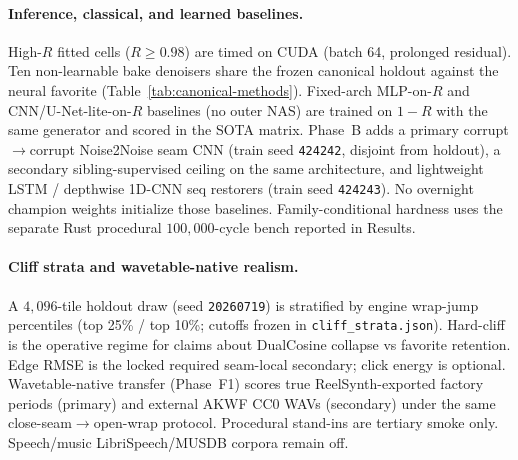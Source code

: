 \paragraph{Inference, classical, and learned baselines.}
High-$R$ fitted cells ($R\ge 0.98$) are timed on CUDA (batch 64, prolonged residual).
Ten non-learnable bake denoisers share the frozen canonical holdout against the neural favorite (Table~\ref{tab:canonical-methods}).
Fixed-arch MLP-on-$R$ and CNN/U-Net-lite-on-$R$ baselines (no outer NAS) are trained on $1{-}R$ with the same generator and scored in the SOTA matrix.
Phase~B adds a primary corrupt$\to$corrupt Noise2Noise seam CNN (train seed \texttt{424242}, disjoint from holdout), a secondary sibling-supervised ceiling on the same architecture, and lightweight LSTM / depthwise 1D-CNN seq restorers (train seed \texttt{424243}).
No overnight champion weights initialize those baselines.
Family-conditional hardness uses the separate Rust procedural $100{,}000$-cycle bench reported in Results.

\paragraph{Cliff strata and wavetable-native realism.}
A $4{,}096$-tile holdout draw (seed \texttt{20260719}) is stratified by engine wrap-jump percentiles (top 25\% / top 10\%; cutoffs frozen in \texttt{cliff\_strata.json}).
Hard-cliff is the operative regime for claims about DualCosine collapse vs favorite retention.
Edge RMSE is the locked required seam-local secondary; click energy is optional.
Wavetable-native transfer (Phase~F1) scores true ReelSynth-exported factory periods (primary) and external AKWF CC0 WAVs (secondary) under the same close-seam$\to$open-wrap protocol.
Procedural stand-ins are tertiary smoke only.
Speech/music LibriSpeech/MUSDB corpora remain off.
